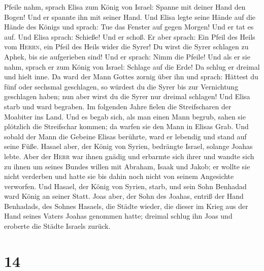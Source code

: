 Pfeile nahm,  sprach Elisa zum König von Israel: Spanne
mit deiner Hand den Bogen! Und er spannte ihn mit seiner Hand. Und Elisa
legte seine Hände auf die Hände des Königs und sprach: 
Tue das Fenster auf gegen Morgen! Und er tat es auf. Und Elisa sprach:
Schieße! Und er schoß. Er aber sprach: Ein Pfeil des Heils vom
\textsc{Herrn}, ein Pfeil des Heils wider die Syrer! Du wirst die Syrer
schlagen zu Aphek, bis sie aufgerieben sind!  Und er
sprach: Nimm die Pfeile! Und als er sie nahm, sprach er zum König von
Israel: Schlage auf die Erde! Da schlug er dreimal und hielt inne.
 Da ward der Mann Gottes zornig über ihn und sprach:
Hättest du fünf oder sechsmal geschlagen, so würdest du die Syrer bis
zur Vernichtung geschlagen haben; nun aber wirst du die Syrer nur
dreimal schlagen!  Und Elisa starb und ward begraben. Im
folgenden Jahre fielen die Streifscharen der Moabiter ins Land.
 Und es begab sich, als man einen Mann begrub, sahen sie
plötzlich die Streifschar kommen; da warfen sie den Mann in Elisas Grab.
Und sobald der Mann die Gebeine Elisas berührte, ward er lebendig und
stand auf seine Füße.  Hasael aber, der König von Syrien,
bedrängte Israel, solange Joahas lebte.  Aber der
\textsc{Herr} war ihnen gnädig und erbarmte sich ihrer und wandte sich
zu ihnen um seines Bundes willen mit Abraham, Isaak und Jakob; er wollte
sie nicht verderben und hatte sie bis dahin noch nicht von seinem
Angesichte verworfen.  Und Hasael, der König von Syrien,
starb, und sein Sohn Benhadad ward König an seiner Statt.
 Joas aber, der Sohn des Joahas, entriß der Hand
Benhadads, des Sohnes Hasaels, die Städte wieder, die dieser im Krieg
aus der Hand seines Vaters Joahas genommen hatte; dreimal schlug ihn
Joas und eroberte die Städte Israels zurück.

\hypertarget{section-13}{%
\section{14}\label{section-13}}


